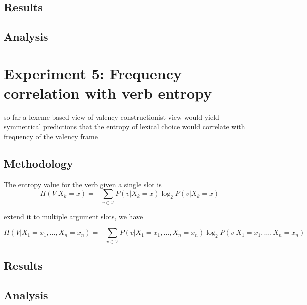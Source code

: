 \subsection{Results}

\subsection{Analysis}

\section{Experiment 5: Frequency correlation with verb entropy}\label{sec:exp5-verb-entropy}
so far a lexeme-based view of valency 
constructionist view would yield symmetrical predictions
that the entropy of lexical choice would correlate with frequency of the valency frame

\subsection{Methodology}

The entropy value for the verb given a single slot is
$$
H(V|X_{k}=x)=
-\sum\limits_{v\in{}\mathcal{V}}{P(v|X_k=x)\log_{2}{P(v|X_k=x)}}
$$

extend it to multiple argument slots, we have

$$
H(V|X_1=x_1,\ldots,X_n=x_n)=
-\sum\limits_{v\in{}\mathcal{V}}{P(v|X_1=x_1,\ldots,X_n=x_n)\log_2P(v|X_1=x_1,\ldots,X_n=x_n)}
$$


\subsection{Results}
\subsection{Analysis}